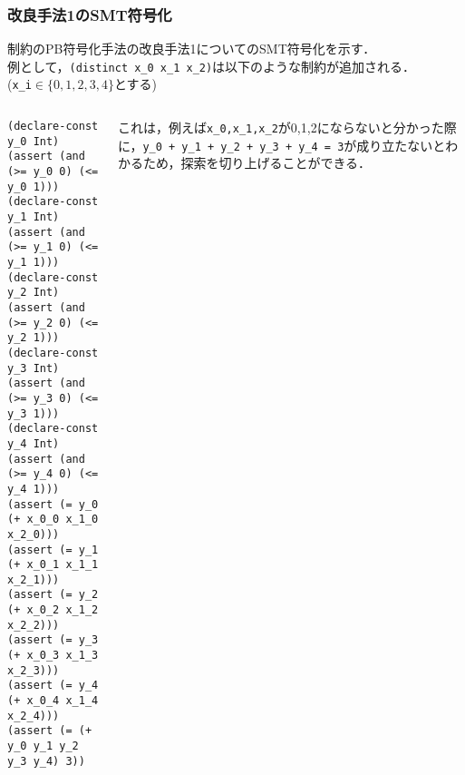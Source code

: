 \begin{frame}[fragile]\footnotesize
    \frametitle{改良手法1のSMT符号化}
    \distinct 制約のPB符号化手法の改良手法1についてのSMT符号化を示す．\\
    例として，\verb|(distinct x_0 x_1 x_2)|は以下のような制約が追加される．\\
    (\verb|x_i|$\in \{0,1,2,3,4\}$とする)

    \begin{columns}
        \begin{column}{0.5\textwidth}
            \begin{exampleblock}{}\scriptsize
\begin{verbatim}
(declare-const y_0 Int)
(assert (and (>= y_0 0) (<= y_0 1)))
(declare-const y_1 Int)
(assert (and (>= y_1 0) (<= y_1 1)))
(declare-const y_2 Int)
(assert (and (>= y_2 0) (<= y_2 1)))
(declare-const y_3 Int)
(assert (and (>= y_3 0) (<= y_3 1)))
(declare-const y_4 Int)
(assert (and (>= y_4 0) (<= y_4 1)))
(assert (= y_0 (+ x_0_0 x_1_0 x_2_0)))
(assert (= y_1 (+ x_0_1 x_1_1 x_2_1)))
(assert (= y_2 (+ x_0_2 x_1_2 x_2_2)))
(assert (= y_3 (+ x_0_3 x_1_3 x_2_3)))
(assert (= y_4 (+ x_0_4 x_1_4 x_2_4)))
(assert (= (+ y_0 y_1 y_2 y_3 y_4) 3))
\end{verbatim}
            \end{exampleblock}
        \end{column}
        \begin{column}{0.5\textwidth}\scriptsize
            これは，例えば\verb|x_0,x_1,x_2|が0,1,2にならないと分かった際に，\verb|y_0 + y_1 + y_2 + y_3 + y_4 = 3|が成り立たないとわかるため，探索を切り上げることができる．
        \end{column}
    \end{columns}
\end{frame}


